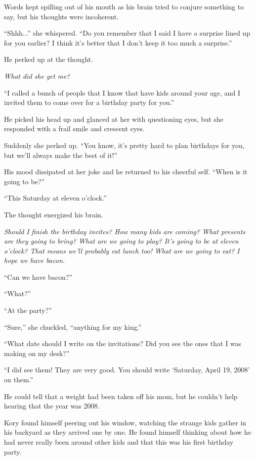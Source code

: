 Words kept spilling out of his mouth as his brain tried to conjure something to say, but his thoughts were incoherent.

``Shhh...'' she whispered. ``Do you remember that I said I have a surprise lined up for you earlier? I think it's better that I don't keep it too much a surprise.''

He perked up at the thought.

\textit{What did she get me?}

``I called a bunch of people that I know that have kids around your age, and I invited them to come over for a birthday party for you.''

He picked his head up and glanced at her with questioning eyes, but she responded with a frail smile and crescent eyes.

Suddenly she perked up. ``You know, it's pretty hard to plan birthdays for you, but we'll always make the best of it!''

His mood dissipated at her joke and he returned to his cheerful self. ``When is it going to be?''

``This Saturday at eleven o'clock.''

The thought energized his brain.

\textit{Should I finish the birthday invites? How many kids are coming? What presents are they going to bring? What are we going to play? It's going to be at eleven o'clock? That means we'll probably eat lunch too! What are we going to eat? I hope we have bacon.}

``Can we have bacon?''

``What?''

``At the party?''

``Sure,'' she chuckled, ``anything for my king.''

``What date should I write on the invitations? Did you see the ones that I was making on my desk?''

``I did see them! They are very good. You should write `Saturday, April 19, 2008' on them.''

He could tell that a weight had been taken off his mom, but he couldn't help hearing that the year was 2008.

\line

Kory found himself peering out his window, watching the strange kids gather in his backyard as they arrived one by one. He found himself thinking about how he had never really been around other kids and that this was his first birthday party.

